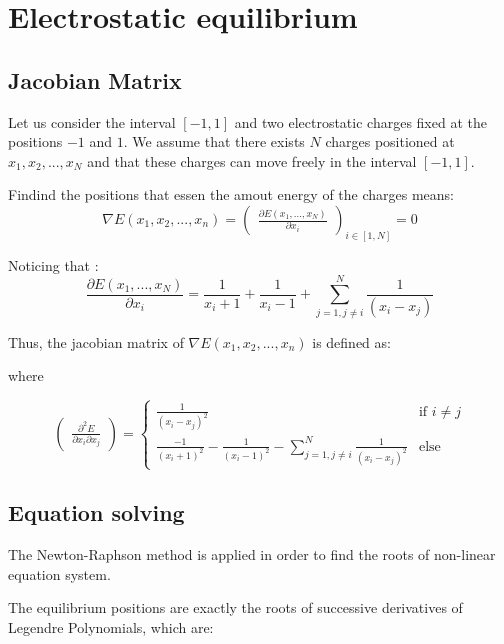 
\section{Electrostatic equilibrium}
\subsection{Jacobian Matrix}
Let us consider the interval $[-1, 1]$ and two electrostatic charges fixed at the positions $-1$ and $1$. We assume that there exists $N$ charges positioned at $x_1, x_2,..., x_N$ and that these charges can move freely in the interval $[-1, 1]$.

Findind the positions that essen the amout energy of the charges means:
\[\nabla E(x_1, x_2, ..., x_n) = \begin{pmatrix}\frac{\partial E(x_1,...,x_N)}{\partial x_i}\end{pmatrix}_{i \in [1,N]} = 0\]

Noticing that : 
\[\frac{\partial E(x_1,...,x_N)}{\partial x_i} = \frac{1}{x_i + 1} + \frac{1}{x_i - 1} +  \displaystyle\sum_{j=1,j\ne i}^{N}\frac{1}{(x_i - x_j)}\]

Thus, the jacobian matrix of $\nabla E(x_1, x_2, ..., x_n)$ is defined as:
\begin{center}
\end{center}
where 

\[\begin{pmatrix}\frac{\partial^2 E}{\partial x_i \partial x_j}\end{pmatrix}  =  \left\{
\begin{array}{ll}
  \frac{1}{(x_i - x_j)^2} & \mbox {if $i\ne j$}\\
  \frac{-1}{(x_i +1)^2 } - \frac{1}{(x_i - 1)^2 } - \displaystyle\sum_{j=1,j\ne i}^{N}\frac{1}{(x_i  - x_j)^2} & \mbox{else}
\end{array}\right.\]

\subsection{Equation solving}
The Newton-Raphson method is applied in order to find the roots of non-linear equation system.

The equilibrium positions are exactly the roots of successive derivatives of Legendre Polynomials, which are: 

\begin{center}
\end{center}
